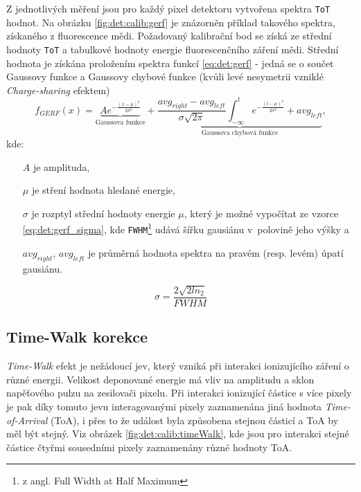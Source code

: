 Z jednotlivých měření jsou pro každý pixel detektoru vytvořena spektra \texttt{ToT} hodnot. Na obrázku \ref{fig:det:calib:gerf} je znázorněn příklad takového spektra, získaného z fluorescence mědi. Požadovaný kalibrační bod se získá ze střední hodnoty \texttt{ToT} a tabulkové hodnoty energie fluorescenčního záření mědi. Střední hodnota je získána proložením spektra funkcí \ref{eq:det:gerf} - jedná se o součet Gaussovy funkce a Gaussovy chybové funkce (kvůli levé nesymetrii vzniklé \textit{Charge-sharing} efektem)
\begin{equation}\label{eq:det:gerf}
	f_{GERF}(x) = \underbrace{Ae^{ -\frac{(x-\mu)^2}{2\sigma^2} }}_{\text{Gaussova funkce}} +
	\underbrace{ \frac{avg_{right} - avg_{left}}{\sigma\sqrt{2\pi}} \int_{-\infty}^t e^{ -\frac{(t-\mu)^2}{2\sigma^2} } + avg_{left}}_{\text{Gaussova chybová funkce}},
\end{equation}
kde:
\begin{changemargin}{1.5cm}{1cm} 
	\begin{itemize}
		\item [$A$] je amplituda,
		\item [$\mu$] je stření hodnota hledané energie,
		\item [$\sigma$] je rozptyl střední hodnoty energie $\mu$, který je možné vypočítat ze vzorce 
			\ref{eq:det:gerf_sigma}, kde \texttt{FWHM}\footnote{z angl. Full Width at Half Maximum} udává šířku gausiánu v~polovině jeho výšky a
		\item [$avg_{right}$, $avg_{left}$] je průměrná hodnota spektra na pravém (resp. levém) úpatí gausiánu.
	\end{itemize}
\end{changemargin}

\begin{equation}\label{eq:det:gerf_sigma}
	\sigma = \frac{2\sqrt{2ln_2}}{FWHM}
\end{equation}

\subsection{Time-Walk korekce}\label{chap:detectors:calibration:timeWalk}

\textit{Time-Walk} efekt je nežádoucí jev, který vzniká při interakci ionizujícího záření o různé energii. Velikost deponované energie má vliv na amplitudu a sklon napěťového pulzu na zesilovači pixelu. Při interakci ionizující částice s více pixely je pak díky tomuto jevu interagovanými pixely zaznamenána jiná hodnota \textit{Time-of-Arrival} (ToA), i přes to že událost byla způsobena stejnou částicí a ToA by měl být stejný. Viz obrázek \ref{fig:det:calib:timeWalk}, kde jsou pro interakci stejné částice čtyřmi sousedními pixely zaznamenány různé hodnoty ToA. 

